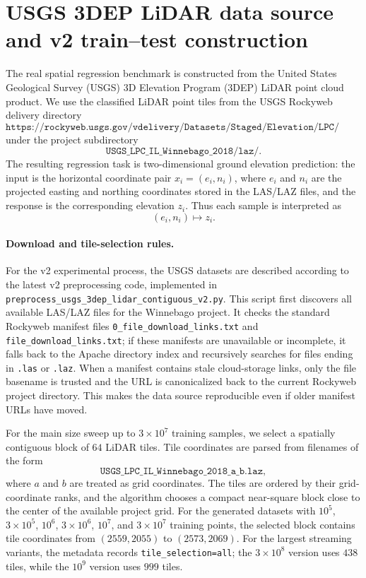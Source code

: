 \section{USGS 3DEP LiDAR data source and v2 train--test construction}
\label{sec:usgs-data-source}

The real spatial regression benchmark is constructed from the United States
Geological Survey (USGS) 3D Elevation Program (3DEP) LiDAR point cloud product.
We use the classified LiDAR point tiles from the USGS Rockyweb delivery
directory
\[
\texttt{https://rockyweb.usgs.gov/vdelivery/Datasets/Staged/Elevation/LPC/Projects/}
\]
under the project subdirectory
\[
\texttt{USGS\_LPC\_IL\_Winnebago\_2018/laz/}.
\]
The resulting regression task is two-dimensional ground elevation prediction:
the input is the horizontal coordinate pair \(x_i=(e_i,n_i)\), where \(e_i\)
and \(n_i\) are the projected easting and northing coordinates stored in the
LAS/LAZ files, and the response is the corresponding elevation \(z_i\).
Thus each sample is interpreted as
\[
(e_i,n_i) \longmapsto z_i .
\]

\paragraph{Download and tile-selection rules.}
For the v2 experimental process, the USGS datasets are described according to
the latest v2 preprocessing code, implemented in
\texttt{preprocess\_usgs\_3dep\_lidar\_contiguous\_v2.py}.  This script first
discovers all available LAS/LAZ files for the Winnebago project.  It checks the
standard Rockyweb manifest files
\texttt{0\_file\_download\_links.txt} and \texttt{file\_download\_links.txt};
if these manifests are unavailable or incomplete, it falls back to the Apache
directory index and recursively searches for files ending in \texttt{.las} or
\texttt{.laz}.  When a manifest contains stale cloud-storage links, only the
file basename is trusted and the URL is canonicalized back to the current
Rockyweb project directory.  This makes the data source reproducible even if
older manifest URLs have moved.

For the main size sweep up to \(3\times 10^7\) training samples, we select a
spatially contiguous block of \(64\) LiDAR tiles.  Tile coordinates are parsed
from filenames of the form
\[
\texttt{USGS\_LPC\_IL\_Winnebago\_2018\_a\_b.laz},
\]
where \(a\) and \(b\) are treated as grid coordinates.  The tiles are ordered by
their grid-coordinate ranks, and the algorithm chooses a compact near-square
block close to the center of the available project grid.  For the generated
datasets with \(10^5\), \(3\times 10^5\), \(10^6\), \(3\times 10^6\),
\(10^7\), and \(3\times 10^7\) training points, the selected block contains
tile coordinates from \((2559,2055)\) to \((2573,2069)\).  For the largest
streaming variants, the metadata records \texttt{tile\_selection=all}; the
\(3\times 10^8\) version uses \(438\) tiles, while the \(10^9\) version uses
\(999\) tiles.

